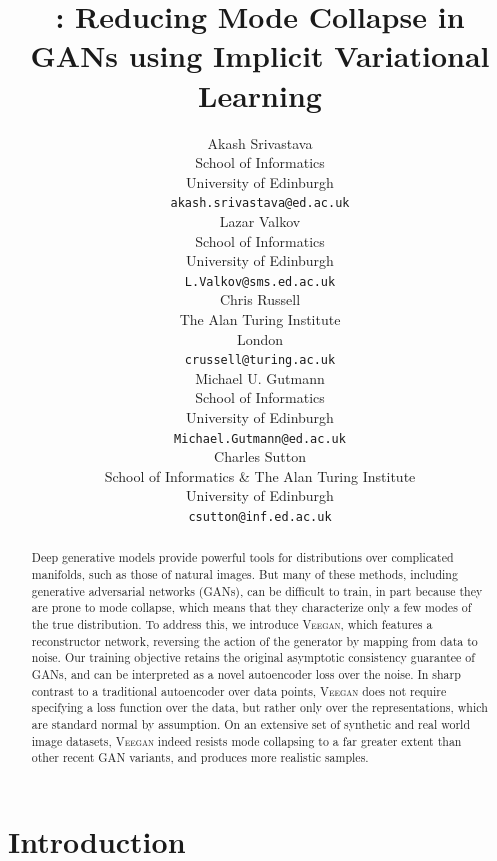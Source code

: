 \documentclass{article}
\title{\acronym: Reducing Mode Collapse in GANs using Implicit Variational Learning}
\author{
  Akash Srivastava\\
  School of Informatics \\
  University of Edinburgh \\
  \texttt{akash.srivastava@ed.ac.uk} \\
  \And
  Lazar Valkov \\
  School of Informatics \\
  University of Edinburgh \\
  \texttt{L.Valkov@sms.ed.ac.uk} \\
  \AND
  Chris Russell \\
  The Alan Turing Institute \\
  London \\
  \texttt{crussell@turing.ac.uk} \\
  \And
  Michael U. Gutmann \\
  School of Informatics \\
  University of Edinburgh \\
  \texttt{Michael.Gutmann@ed.ac.uk} \\
  \And
  Charles Sutton \\
  School of Informatics \& The Alan Turing Institute \\
  University of Edinburgh \\
  \texttt{csutton@inf.ed.ac.uk} \\
}
\newcommand{\acronym}{\textsc{Veegan}\xspace}
\begin{document}

\maketitle

\begin{abstract}
Deep generative models provide  powerful 
tools for distributions over complicated
manifolds, such as those of natural images.
But many of these methods, including generative adversarial networks (GANs), can be  difficult to train, in part because they are prone to mode collapse, which means that they characterize only a few modes of the true distribution.
To address this,
we introduce \acronym,
which features a reconstructor network, reversing the action of the generator by mapping from
data to noise.
Our training objective retains
the original asymptotic consistency guarantee of  GANs, 
and can
be interpreted as
a novel autoencoder loss over the noise. 
In sharp contrast to a traditional
autoencoder over data points, \acronym does not require specifying
a loss function over the data,
but rather only over the representations, which are standard normal by assumption.
On an extensive set of synthetic  and real world 
image datasets, \acronym indeed
resists mode collapsing
to a far greater extent than other recent GAN variants, and produces more realistic samples.
\end{abstract}


\section{Introduction}
\label{sec:intro}
\end{document}
